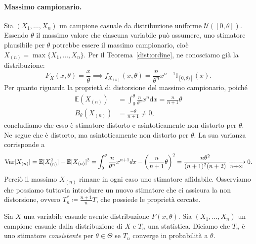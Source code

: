 \paragraph{Massimo campionario.} Sia \((X_1,\dotsc,X_n)\) un campione casuale da distribuzione uniforme \(\mathcal{U}([0,\theta])\). Essendo \(\theta\) il massimo valore che ciascuna variabile può assumere, uno stimatore plausibile
per \(\theta\) potrebbe essere il massimo campionario, cioè \(X_{(n)} = \max\lbrace X_1,\dotsc,X_n\rbrace\). Per il Teorema~\ref{dist:ordine}, ne conosciamo già la distribuzione:
\begin{equation*}
  F_X(x,\theta) = \frac{x}{\theta} \implies
  f_{X_{(n)}}(x,\theta) = \frac{n}{\theta^n}x^{n-1}\mathbb{I}_{[0,\theta)]}(x).
\end{equation*}
Per quanto riguarda la proprietà di distorsione del massimo campionario, poiché
\begin{align*}
  \mathbb{E}(X_{(n)}) &= \int_0^\theta \frac{n}{\theta^n}x^n\mathrm{d}x
                     = \frac{n}{n+1}\theta \\
  B_{\theta}(X_{(n)}) &= \frac{-\theta}{n+1} \ne 0,
\end{align*}
concludiamo che esso è stimatore distorto e asintoticamente non distorto
per \(\theta\).
Ne segue che è distorto, ma asintoticamente non distorto per $\theta$.
La sua varianza corrisponde a
\begin{equation*}
  \operatorname{Var}[X_{(n)}]=\mathbb{E}[X_{(n)}^2]-\mathbb{E}[X_{(n)}]^2=\int_0^\theta \frac{n}{\theta^n}x^{n+1} dx -\left(\frac{n}{n+1}\theta\right)^2=\frac{n\theta^2}{(n+1)^2(n+2)}
  \xrightarrow[n\rightarrow \infty]{}0.
\end{equation*}
Perciò il massimo $X_{(n)}$ rimane in ogni caso uno stimatore affidabile. Osserviamo che possiamo tuttavia introdurre un nuovo stimatore che ci assicura la non distorsione, ovvero $T_n^*\coloneqq \frac{n+1}{n}T$, che possiede le proprietà cercate.

\begin{dfn}[Consistenza]
  Sia \(X\) una variabile casuale avente distribuzione \(F(x,\theta)\).
  Sia \((X_1,\dotsc,X_n)\) un campione casuale dalla distribuzione di \(X\) e
  \(T_n\) una statistica. Diciamo che \(T_n\) è uno stimatore \emph{consistente}
  per \(\theta \in \Theta\) se %
  \(T_n\) converge in probabilità a \(\theta\).
\end{dfn}

